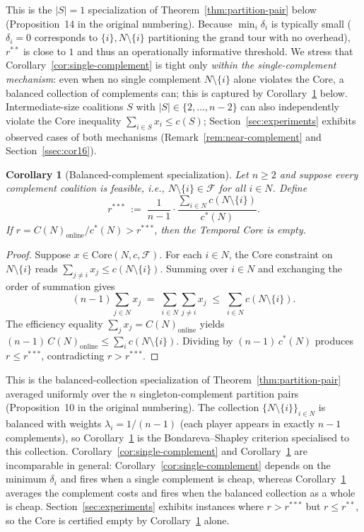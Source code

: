 \documentclass[11pt]{article}
\theoremstyle{plain}
\newtheorem{corollary}[theorem]{Corollary}
\theoremstyle{definition}
\theoremstyle{remark}
\newcommand{\F}{\mathcal{F}}
\newcommand{\cstar}{c^{\ast}}
\begin{document}
This is the $|S|=1$ specialization of Theorem~\ref{thm:partition-pair} below (Proposition~14 in the original numbering). Because $\min_i \delta_i$ is typically small ($\delta_i=0$ corresponds to $\{i\},N\setminus\{i\}$ partitioning the grand tour with no overhead), $r^{\ast\ast}$ is close to $1$ and thus an operationally informative threshold. We stress that Corollary~\ref{cor:single-complement} is tight only \emph{within the single-complement mechanism}: even when no single complement $N\setminus\{i\}$ alone violates the Core, a balanced collection of complements can; this is captured by Corollary~\ref{cor:balanced-complement} below. Intermediate-size coalitions $S$ with $|S|\in\{2,\ldots,n-2\}$ can also independently violate the Core inequality $\sum_{i\in S} x_i \le c(S)$; Section~\ref{sec:experiments} exhibits observed cases of both mechanisms (Remark~\ref{rem:near-complement} and Section~\ref{ssec:cor16}).

\begin{corollary}[Balanced-complement specialization]
\label{cor:balanced-complement}
Let $n\ge 2$ and suppose every complement coalition is feasible, i.e., $N\setminus\{i\}\in\F$ for all $i\in N$. Define
\[
r^{\ast\ast\ast} \;:=\; \frac{1}{n-1}\cdot\frac{\sum_{i\in N} c(N\setminus\{i\})}{\cstar(N)}.
\]
If $r = C(N)_{\text{online}}/\cstar(N) > r^{\ast\ast\ast}$, then the Temporal Core is empty.
\end{corollary}

\begin{proof}
Suppose $x\in\mathrm{Core}(N,c,\F)$. For each $i\in N$, the Core constraint on $N\setminus\{i\}$ reads $\sum_{j\ne i} x_j \le c(N\setminus\{i\})$. Summing over $i\in N$ and exchanging the order of summation gives
\[
(n-1)\sum_{j\in N} x_j \;=\; \sum_{i\in N}\sum_{j\ne i} x_j \;\le\; \sum_{i\in N} c(N\setminus\{i\}).
\]
The efficiency equality $\sum_j x_j = C(N)_{\text{online}}$ yields $(n-1)\,C(N)_{\text{online}} \le \sum_i c(N\setminus\{i\})$. Dividing by $(n-1)\,\cstar(N)$ produces $r \le r^{\ast\ast\ast}$, contradicting $r>r^{\ast\ast\ast}$.
\end{proof}

This is the balanced-collection specialization of Theorem~\ref{thm:partition-pair} averaged uniformly over the $n$ singleton-complement partition pairs (Proposition~10 in the original numbering). The collection $\{N\setminus\{i\}\}_{i\in N}$ is balanced with weights $\lambda_i = 1/(n-1)$ (each player appears in exactly $n-1$ complements), so Corollary~\ref{cor:balanced-complement} is the Bondareva--Shapley criterion \citep{shapley1971core} specialised to this collection. Corollary~\ref{cor:single-complement} and Corollary~\ref{cor:balanced-complement} are incomparable in general: Corollary~\ref{cor:single-complement} depends on the minimum $\delta_i$ and fires when a single complement is cheap, whereas Corollary~\ref{cor:balanced-complement} averages the complement costs and fires when the balanced collection as a whole is cheap. Section~\ref{sec:experiments} exhibits instances where $r > r^{\ast\ast\ast}$ but $r\le r^{\ast\ast}$, so the Core is certified empty by Corollary~\ref{cor:balanced-complement} alone.
\end{document}
